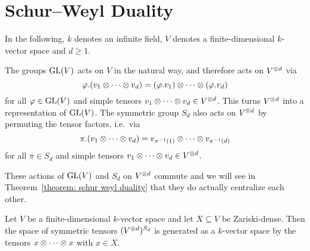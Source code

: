 \section{Schur--Weyl Duality}

\begin{conventions}
  In the following, $k$ denotes an infinite field, $V$ denotes a finite-dimensional $k$-vector space and $d \geq 1$.
\end{conventions}

\begin{fluff}
  The groups $\operatorname{GL}(V)$ acts on $V$ in the natural way, and therefore acts on $V^{\mathbin{\otimes} d}$ via
  \[
      \varphi.(v_1 \mathbin{\otimes} \dotsb \mathbin{\otimes} v_d)
    = (\varphi.v_1) \mathbin{\otimes} \dotsb \mathbin{\otimes} (\varphi.v_d)
  \]
  for all $\varphi \in \operatorname{GL}(V)$ and simple tensors $v_1 \mathbin{\otimes} \dotsb \mathbin{\otimes} v_d \in V^{\mathbin{\otimes} d}$.
  This turns $V^{\mathbin{\otimes} d}$ into a representation of $\operatorname{GL}(V)$.
  The symmetric group $S_d$ also acts on $V^{\mathbin{\otimes} d}$ by permuting the tensor factors, i.e.\ via
  \[
      \pi.(v_1 \mathbin{\otimes} \dotsb \mathbin{\otimes} v_d)
    = v_{\pi^{-1}(1)} \mathbin{\otimes} \dotsb \mathbin{\otimes} v_{\pi^{-1}(d)}
  \]
  for all $\pi \in S_d$ and simple tensors $v_1 \mathbin{\otimes} \dotsb \mathbin{\otimes} v_d \in V^{\mathbin{\otimes} d}$. 
  
  These actions of $\operatorname{GL}(V)$ and $S_d$ on $V^{\mathbin{\otimes} d}$ commute and we will see in Theorem~\ref{theorem: schur weyl duality} that they do actually centralize each other.
\end{fluff}


\begin{lemma}
  \label{lemma: symmetric tensors and zariski dense subsets}
  Let $V$ be a finite-dimensional $k$-vector space and let $X \subseteq V$ be Zariski-dense.
  Then the space of symmetric tensors $( V^{\mathbin{\otimes} d} )^{S_d}$ is generated as a $k$-vector space by the tensors $x \mathbin{\otimes} \dotsb \mathbin{\otimes} x$ with $x \in X$.
\end{lemma}


